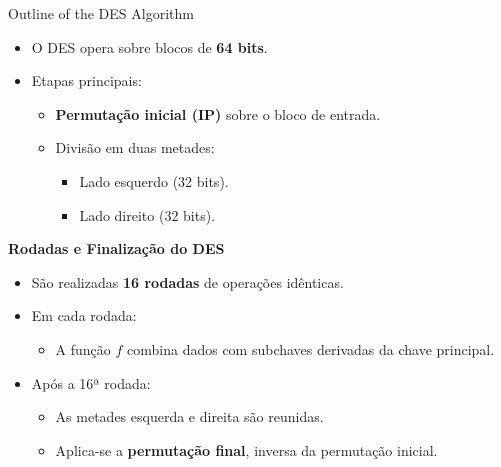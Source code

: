 \begin{frame}{Outline of the DES Algorithm}
    \begin{itemize}
        \item O DES opera sobre blocos de \textbf{64 bits}.
        \item Etapas principais:
              \begin{itemize}
                  \item \textbf{Permutação inicial (IP)} sobre o bloco de entrada.
                  \item Divisão em duas metades:
                        \begin{itemize}
                            \item Lado esquerdo (32 bits).
                            \item Lado direito (32 bits).
                        \end{itemize}
              \end{itemize}
    \end{itemize}


    \textbf{Rodadas e Finalização do DES}
    \begin{itemize}
        \item São realizadas \textbf{16 rodadas} de operações idênticas.
        \item Em cada rodada:
              \begin{itemize}
                  \item A função $f$ combina dados com subchaves derivadas da chave principal.
              \end{itemize}
        \item Após a 16ª rodada:
              \begin{itemize}
                  \item As metades esquerda e direita são reunidas.
                  \item Aplica-se a \textbf{permutação final}, inversa da permutação inicial.
              \end{itemize}
    \end{itemize}
\end{frame}

